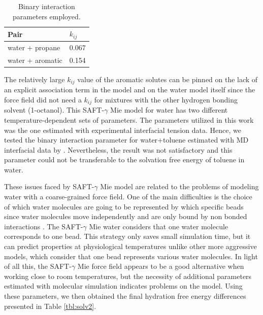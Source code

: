 \begin{table}[h]
  \centering
  \caption{Binary interaction parameters employed.}
  \label{tbl:kij}
  \begin{tabular}{ll}
    \hline
    \hline
      Pair & $k_{ij}$ \\
    \hline
    water  + propane      & 0.067  \\
    water  + aromatic      & 0.154 \\  
    \hline
    \hline
  \end{tabular}
\end{table}

The relatively large $k_{ij}$ value of the aromatic solutes can be pinned on the lack of an explicit association term in the model and on the water model itself since the force field did not need a $k_{ij}$ for mixtures with the other hydrogen bonding solvent (1-octanol).  This SAFT-$\gamma$ Mie model for water \cite{lobanova2016} has two different temperature-dependent sets of parameters. The parameters utilized in this work was the one estimated with experimental interfacial tension data. Hence, we tested the binary interaction parameter for water+toluene estimated with MD interfacial data by . Nevertheless, the result was not satisfactory and this parameter could not be transferable to the solvation free energy of toluene in water. 

These issues faced by SAFT-$\gamma$ Mie model are related to the problems of modeling water with a coarse-grained force field. One of the main difficulties is the choice of which water molecules are going to be represented by which specific beads since water molecules move independently and are only bound by non bonded interactions \cite{hadley2010,hadley2012}. The  SAFT-$\gamma$ Mie water considers that one water molecule corresponds to one bead. This strategy only saves small simulation time, but it can predict properties at physiological temperatures unlike other more aggressive models, which consider that one bead represents various water molecules. In light of all this, the SAFT-$\gamma$ Mie force field appears to be a good alternative when working close to room temperatures, but the necessity of additional parameters estimated with molecular simulation indicates problems on the model. Using these parameters, we then obtained the final hydration free energy differences presented in Table \ref{tbl:solv2}. 

